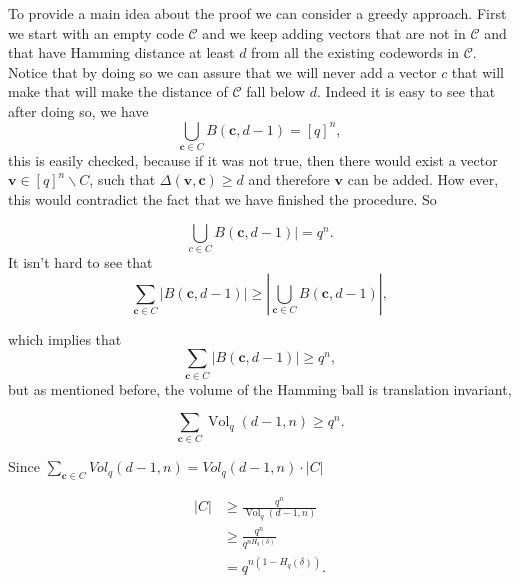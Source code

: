\indent To provide a main idea about the proof we can consider a greedy approach. First we start with an empty code $\mathcal{C}$ and we keep adding vectors that are not in $\mathcal{C}$ and that have Hamming distance at least $d$ from all the existing codewords in $\mathcal{C}$. Notice that by doing so we can assure that we will never add a vector $c$ that will make that will make the distance of $\mathcal{C}$ fall below $d$. Indeed it is easy to see that after doing so, we have
\begin{equation}
\bigcup_{\mathbf{c} \in C} B(\mathbf{c}, d-1)=[q]^{n},
\label{CH2:Gilbert_Varshamov_1}
\end{equation}
this is easily checked, because if it was not true, then there would exist a vector $\mathbf{v} \in[q]^{n} \backslash C$, such that $\Delta(\mathbf{v}, \mathbf{c}) \geq d$ and therefore $\mathbf{v}$ can be added. How ever, this would contradict the fact that we have finished the procedure. So

\begin{equation}
\bigcup_{c \in C} B(\mathbf{c}, d-1) \mid=q^{n}.
\label{CH2:Gilbert_Varshamov_2}
\end{equation}
It isn't hard to see that
\begin{equation}
\sum_{\mathbf{c} \in C}|B(\mathbf{c}, d-1)| \geq\left|\bigcup_{\mathbf{c} \in C} B(\mathbf{c}, d-1)\right|,
\label{CH2:Gilbert_Varshamov_3}
\end{equation}

which implies that
\begin{equation}
\sum_{\mathbf{c} \in C}|B(\mathbf{c}, d-1)| \geq q^{n},
\label{CH2:Gilbert_Varshamov_4}
\end{equation}
but as mentioned before, the volume of the Hamming ball is translation invariant,

\begin{equation}
\sum_{\mathbf{c} \in C} \operatorname{Vol}_{q}(d-1, n) \geq q^{n}.
\label{CH2:Gilbert_Varshamov_5}
\end{equation}

Since $\sum_{\mathbf{c} \in C} V o l_{q}(d-1, n)=V o l_{q}(d-1, n) \cdot|C|$ 

\begin{equation}
\begin{aligned}
|C| & \geq \frac{q^{n}}{\operatorname{Vol}_{q}(d-1, n)} \\
& \geq \frac{q^{n}}{q^{n H_{q}(\delta)}} \\
&=q^{n\left(1-H_{q}(\delta)\right)}.
\end{aligned}
\label{CH2:Gilbert_Varshamov_final}
\end{equation}

